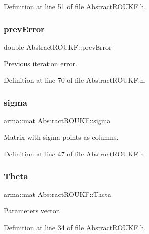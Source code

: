 Definition at line 51 of file Abstract\+R\+O\+U\+K\+F.\+h.

\mbox{\label{classAbstractROUKF_a699ef3cc8c3c5fa650d065e6dd77e12a}} 
\subsubsection{\texorpdfstring{prev\+Error}{prevError}}
{\footnotesize\ttfamily double Abstract\+R\+O\+U\+K\+F\+::prev\+Error\hspace{0.3cm}{\ttfamily [protected]}}

Previous iteration error. 

Definition at line 70 of file Abstract\+R\+O\+U\+K\+F.\+h.

\mbox{\label{classAbstractROUKF_a1d02b594a134c2644c0b64889c9ab34a}} 
\subsubsection{\texorpdfstring{sigma}{sigma}}
{\footnotesize\ttfamily arma\+::mat Abstract\+R\+O\+U\+K\+F\+::sigma\hspace{0.3cm}{\ttfamily [protected]}}

Matrix with sigma points as columns. 

Definition at line 47 of file Abstract\+R\+O\+U\+K\+F.\+h.

\mbox{\label{classAbstractROUKF_a09460cd2349481e27e68718f47ad354b}} 
\subsubsection{\texorpdfstring{Theta}{Theta}}
{\footnotesize\ttfamily arma\+::mat Abstract\+R\+O\+U\+K\+F\+::\+Theta\hspace{0.3cm}{\ttfamily [protected]}}

Parameters vector. 

Definition at line 34 of file Abstract\+R\+O\+U\+K\+F.\+h.

